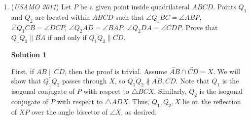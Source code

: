 \begin{enumerate}
 Let $\textstyle n=p^2$ for some odd prime $\textstyle p$. Then $\textstyle \varphi(p^2) = p^2 - p$. Since 2 is co-prime to $\textstyle p^2$, we have
 \[{2^{\varphi(p^2)} \equiv 1 \pmod{p^2}}\]and thus
 \[\textstyle 2^{p^2} \equiv 2^{(p^2 - p) + p} \equiv 2^p \pmod{p^2}.\]

 Therefore, for a counter-example, it suffices that $\textstyle 2^p \pmod{p^2}$ be odd. Choosing $\textstyle p=5$, we have $\textstyle 2^5 = 32 \equiv 7 \pmod{25}$. Therefore, $\textstyle 2^{25} \equiv 7 \pmod{25}$ and thus
 \[\textstyle 2^{2^{25}} \equiv 2^7 \pmod {2^{25} - 1}.\]Since $\textstyle 2^7$ is not a power of 4, we are done.

 



\textbf{Solution 2}

Lemma (useful for all situations): If $x$ and $y$ are positive integers such that $2^x - 1$ divides $2^y - 1$, then $x$ divides $y$.Proof: $2^y \equiv 1 \pmod{2^x - 1}$. Replacing the $1$ with a $2^x$ and dividing out the powers of two should create an easy induction proof which will be left to the reader as an Exercise.

 Consider $n = 25$. We will prove that this case is a counterexample via contradiction.

 Because $4 = 2^2$, we will assume there exists a positive integer $k$ such that $2^{2^n} - 2^{2k}$ divides $2^n - 1$ and $2^{2k} < 2^n - 1$. Dividing the powers of $2$ from LHS gives $2^{2^n - 2k} - 1$ divides $2^n - 1$. Hence, $2^n - 2k$ divides $n$. Because $n = 25$ is odd, $2^{24} - k$ divides $25$. Euler's theorem gives $2^{24} \equiv 2^4 \equiv 16 \pmod{25}$ and so $k \ge 16$. However, $2^{2k} \geq 2^{32} > 2^{25} - 1$, a contradiction. Thus, $n = 25$ is a valid counterexample.

 


	\item (\textit{USAMO 2011}) Let $P$ be a given point inside quadrilateral $ABCD$.  Points $Q_1$ and $Q_2$ are located within $ABCD$ such that $\angle Q_1 BC = \angle ABP$, $\angle Q_1 CB = \angle DCP$, $\angle Q_2 AD = \angle BAP$, $\angle Q_2 DA = \angle CDP$.  Prove that $\overline{Q_1 Q_2} \parallel \overline{BA}$ if and only if $\overline{Q_1 Q_2} \parallel \overline{CD}$.


 



\textbf{Solution 1}

First, if $\overline{AB} \parallel \overline{CD}$, then the proof is trivial. Assume $\overleftrightarrow{AB} \cap \overleftrightarrow{CD} = X$. We will show that $\overleftrightarrow{Q_1Q_2}$ passes through $X$, so $\overline{Q_1Q_2} \not \parallel \overline{AB}, \overline{CD}$. Note that $Q_1$ is the isogonal conjugate of $P$ with respect to $\triangle BCX$. Similarly, $Q_2$ is the isogonal conjugate of $P$ with respect to $\triangle ADX$. Thus, $Q_1, Q_2, X$ lie on the reflection of ${XP}$ over the angle bisector of $\angle X$, as desired.


\end{enumerate}
